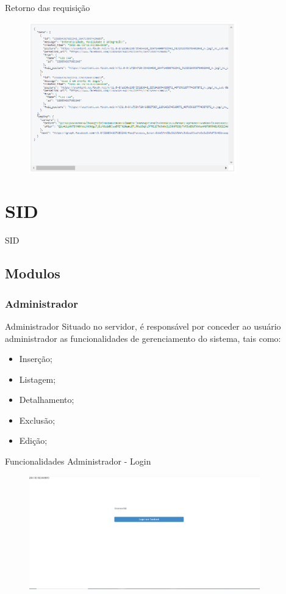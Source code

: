 \documentclass{aula-ifb}
\begin{document}
\begin{frame}{Retorno das requisição}
\begin{figure}[h]
\includegraphics[width=9cm]{figuras/requisicao2.png}
\label{fig:facebookgraph}
\end{figure}
\end{frame}

\section{SID}
\begin{frame}
SID
\end{frame}
\subsection{Modulos}
\subsubsection{Administrador}
\begin{frame}{Administrador}
Situado no servidor, é responsável por conceder ao usuário administrador as funcionalidades de gerenciamento do sistema, tais como:
\begin{itemize}
   \item Inserção;
   \item Listagem;
   \item Detalhamento;
   \item Exclusão;
   \item Edição;
\end{itemize}
\end{frame}

\begin{frame}{Funcionalidades Administrador - Login}
\begin{figure}[h]
\includegraphics[width=10cm]{figuras/funcionalidadelogin.png}
\label{fig:facebookgraph}
\end{figure}
\end{frame}
\end{document}
